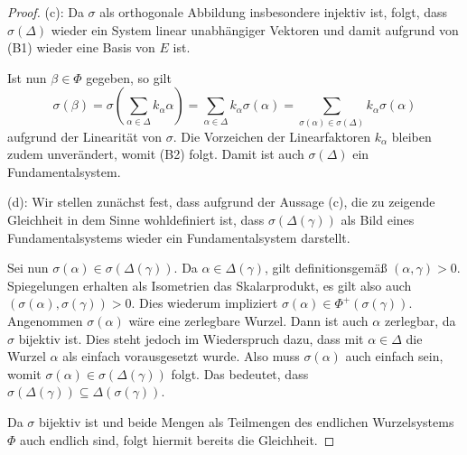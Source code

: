 \begin{proof}
  (c): 
  Da $\sigma$ als orthogonale Abbildung insbesondere injektiv ist, folgt, dass $\sigma(\Delta)$ wieder ein System linear unabhängiger Vektoren und damit aufgrund von (B1) wieder eine Basis von $E$ ist.
  
  Ist nun $\beta \in \Phi$ gegeben, so gilt
  \begin{displaymath}
  \sigma(\beta) 
    = \sigma(\sum_{\alpha \in \Delta} k_\alpha \alpha)
    = \sum_{\alpha \in \Delta} k_\alpha \sigma(\alpha)
    = \sum_{\sigma(\alpha) \in \sigma(\Delta)} k_\alpha \sigma(\alpha)
  \end{displaymath}
  aufgrund der Linearität von $\sigma$.
  Die Vorzeichen der Linearfaktoren $k_\alpha$ bleiben zudem unverändert, womit (B2) folgt.
  Damit ist auch $\sigma(\Delta)$ ein Fundamentalsystem.

  (d):
  Wir stellen zunächst fest, dass aufgrund der Aussage (c), die zu zeigende Gleichheit in dem Sinne wohldefiniert ist, dass $\sigma(\Delta(\gamma))$ als Bild eines Fundamentalsystems wieder ein Fundamentalsystem darstellt.

  Sei nun $\sigma(\alpha) \in \sigma(\Delta(\gamma))$.
  Da $\alpha \in \Delta(\gamma)$, gilt definitionsgemäß $(\alpha, \gamma) > 0$.
  Spiegelungen erhalten als Isometrien das Skalarprodukt, es gilt also auch $(\sigma(\alpha), \sigma(\gamma)) > 0$.
  Dies wiederum impliziert $\sigma(\alpha) \in \Phi^+(\sigma(\gamma))$.
  Angenommen $\sigma(\alpha)$ wäre eine zerlegbare Wurzel.
  Dann ist auch $\alpha$ zerlegbar, da $\sigma$ bijektiv ist.
  Dies steht jedoch im Wiederspruch dazu, dass mit $\alpha \in \Delta$ die Wurzel $\alpha$ als einfach vorausgesetzt wurde.
  Also muss $\sigma(\alpha)$ auch einfach sein, womit $\sigma(\alpha) \in \sigma(\Delta(\gamma))$ folgt.
  Das bedeutet, dass $\sigma(\Delta(\gamma)) \subseteq \Delta(\sigma(\gamma))$.
  
  Da $\sigma$ bijektiv ist und beide Mengen als Teilmengen des endlichen Wurzelsystems $\Phi$ auch endlich sind, folgt hiermit bereits die Gleichheit.
\end{proof}
